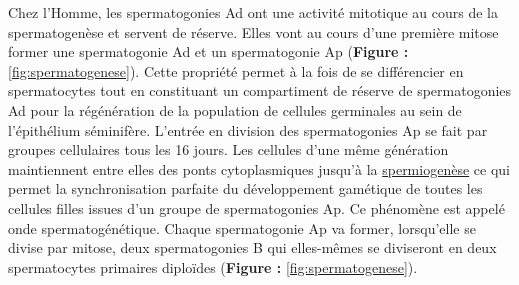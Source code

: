 \documentclass[12pt,a4paper,twoside]{ugathesis}
\theoremstyle{definition}
\theoremstyle{definition}
\theoremstyle{definition}
\theoremstyle{remark}
\begin{document}
Chez l'Homme, les spermatogonies Ad ont une activité mitotique au cours
de la spermatogenèse et servent de réserve. Elles vont au cours d'une
première mitose former une spermatogonie Ad et un spermatogonie Ap
(\textbf{Figure :} \ref{fig:spermatogenese}). Cette propriété permet à
la fois de se différencier en spermatocytes tout en constituant un
compartiment de réserve de spermatogonies Ad pour la régénération de la
population de cellules germinales au sein de l'épithélium séminifère.
L'entrée en division des spermatogonies Ap se fait par groupes
cellulaires tous les 16 jours. Les cellules d'une même génération
maintiennent entre elles des ponts cytoplasmiques jusqu'à la
\protect\hyperlink{spermiogenese}{spermiogenèse} ce qui permet la
synchronisation parfaite du développement gamétique de toutes les
cellules filles issues d'un groupe de spermatogonies Ap. Ce phénomène
est appelé onde spermatogénétique. Chaque spermatogonie Ap va former,
lorsqu'elle se divise par mitose, deux spermatogonies B qui elles-mêmes
se diviseront en deux spermatocytes primaires diploïdes (\textbf{Figure
:} \ref{fig:spermatogenese}).

\newpage
\end{document}
